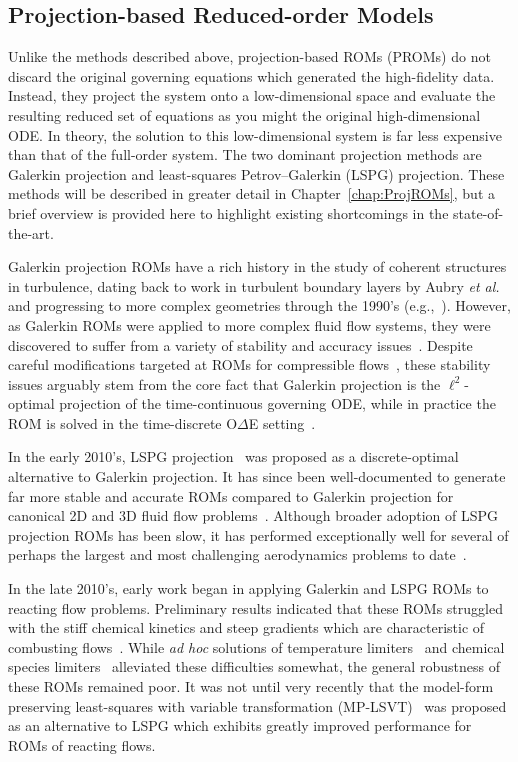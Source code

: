 \subsection{Projection-based Reduced-order Models}

Unlike the methods described above, projection-based ROMs (PROMs) do not discard the original governing equations which generated the high-fidelity data. Instead, they project the system onto a low-dimensional space and evaluate the resulting reduced set of equations as you might the original high-dimensional ODE. In theory, the solution to this low-dimensional system is far less expensive than that of the full-order system. The two dominant projection methods are Galerkin projection and least-squares Petrov--Galerkin (LSPG) projection. These methods will be described in greater detail in Chapter~\ref{chap:ProjROMs}, but a brief overview is provided here to highlight existing shortcomings in the state-of-the-art.

Galerkin projection ROMs have a rich history in the study of coherent structures in turbulence, dating back to work in turbulent boundary layers by Aubry \textit{et al.}~\cite{Aubry1988} and progressing to more complex geometries through the 1990's (e.g.,~\cite{Deane1991,Deane1994,Cazemier1998,BuiThanh2007}). However, as Galerkin ROMs were applied to more complex fluid flow systems, they were discovered to suffer from a variety of stability and accuracy issues~\cite{Rempfer2000}. Despite careful modifications targeted at ROMs for compressible flows~\cite{rowleyGpod,Kalashnikova2011}, these stability issues arguably stem from the core fact that Galerkin projection is the $\ell^2$-optimal projection of the time-continuous governing ODE, while in practice the ROM is solved in the time-discrete O$\Delta$E setting~\cite{Grimberg2020}.

In the early 2010's, LSPG projection~\cite{Carlberg2010,Carlberg2013} was proposed as a discrete-optimal alternative to Galerkin projection. It has since been well-documented to generate far more stable and accurate ROMs compared to Galerkin projection for canonical 2D and 3D fluid flow problems~\cite{Carlberg2017}. Although broader adoption of LSPG projection ROMs has been slow, it has performed exceptionally well for several of perhaps the largest and most challenging aerodynamics problems to date~\cite{Grimberg2021}.

In the late 2010's, early work began in applying Galerkin and LSPG ROMs to reacting flow problems. Preliminary results indicated that these ROMs struggled with the stiff chemical kinetics and steep gradients which are characteristic of combusting flows~\cite{Huang2018a,Huang2018b}. While \textit{ad hoc} solutions of temperature limiters~\cite{Huang2019} and chemical species limiters~\cite{Huang2020} alleviated these difficulties somewhat, the general robustness of these ROMs remained poor.  It was not until very recently that the model-form preserving least-squares with variable transformation (MP-LSVT)~\cite{Huang2022} was proposed as an alternative to LSPG which exhibits greatly improved performance for ROMs of reacting flows.

